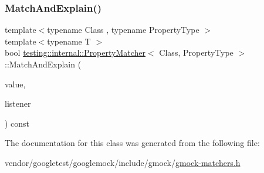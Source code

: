 \mbox{\label{classtesting_1_1internal_1_1_property_matcher_afb672c72a70b06792027f7128dd8a1e6}} 
\subsubsection{\texorpdfstring{Match\+And\+Explain()}{MatchAndExplain()}}
{\footnotesize\ttfamily template$<$typename Class , typename Property\+Type $>$ \\
template$<$typename T $>$ \\
bool \hyperlink{classtesting_1_1internal_1_1_property_matcher}{testing\+::internal\+::\+Property\+Matcher}$<$ Class, Property\+Type $>$\+::Match\+And\+Explain (\begin{DoxyParamCaption}\item[{const T \&}]{value,  }\item[{\hyperlink{classtesting_1_1_match_result_listener}{Match\+Result\+Listener} $\ast$}]{listener }\end{DoxyParamCaption}) const\hspace{0.3cm}{\ttfamily [inline]}}



The documentation for this class was generated from the following file\+:\begin{DoxyCompactItemize}
\item 
vendor/googletest/googlemock/include/gmock/\hyperlink{gmock-matchers_8h}{gmock-\/matchers.\+h}\end{DoxyCompactItemize}
